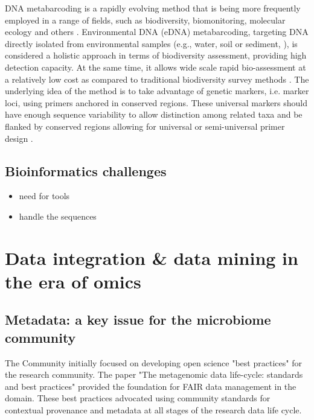    DNA metabarcoding is a rapidly evolving method that is being more frequently employed in a range of fields, such as biodiversity, biomonitoring, molecular ecology and others \citep{deiner2017environmental, ruppert2019past}. 
   Environmental DNA (eDNA) metabarcoding, targeting DNA directly isolated from environmental samples (e.g., water, soil or sediment, \citep{taberlet2012environmental}), is considered a holistic approach \citep{stat2017ecosystem} in terms of biodiversity assessment, providing high detection capacity. 
   At the same time, it allows wide scale rapid bio-assessment \citep{stat2017ecosystem} at a relatively low cost as compared to traditional biodiversity survey methods \citep{ji2013reliable}. 
   The underlying idea of the method is to take advantage of genetic markers, i.e. marker loci, using primers anchored in conserved regions. 
   These universal markers should have enough sequence variability to allow distinction among related taxa and be flanked by conserved regions allowing for universal or semi-universal primer design \citep{deagle2014dna}. 



\subsection{Bioinformatics challenges}


   \begin{itemize}
      \item need for tools 
      \item handle the sequences 
   \end{itemize}




\section{Data integration \& data mining in the era of omics}


\subsection{Metadata: a key issue for the microbiome community}

   The Community initially focused on developing open science "best practices" for the research community. 
   The paper "The metagenomic data life-cycle: standards and best practices" \citep{ten2017metagenomic} provided the foundation for FAIR data management in the domain. 
   These best practices advocated using community standards for contextual provenance and metadata at all stages of the research data life cycle.

